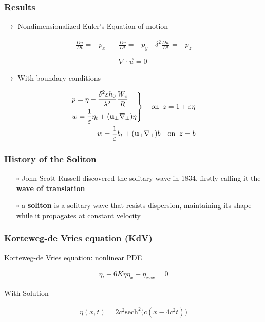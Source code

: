 \documentclass[fleqn]{beamer}
\begin{document}
    \begin{frame}
        \frametitle{Results}
        \centering
        $\rightarrow$ Nondimensionalized Euler's Equation of motion
        \begin{ceqn}
        \begin{align}
            \frac{Du}{Dt} = - p_x \quad
            &\frac{Dv}{Dt} = - p_y \quad
            \delta^2\frac{Dw}{Dt} = - p_z \nonumber\\
            \nonumber\\
            &\nabla \cdot \vec{u}  = 0\nonumber
        \end{align}
        \end{ceqn}
        \centering
        $\rightarrow$ With boundary conditions
        \begin{ceqn}
        \begin{align}
            \begin{drcases}
            p = \eta - \frac{\delta^2\varepsilon h_0}{\lambda^2} \frac{W_e}{R}\\
            w = \frac{1}{\varepsilon}\eta_t + (\mathbf{u}_\perp \nabla_\perp)\eta
            \end{drcases} \quad
            \text{on}\;\; z = 1+\varepsilon\eta\\
            w =\frac{1}{\varepsilon}b_t + (\mathbf{u}_\perp \nabla_\perp)b \quad
            \text{on}\;\; z=b
        \end{align}
        \end{ceqn}
    \end{frame}

    \begin{frame}
        \frametitle{History of the Soliton}
        \begin{itemize}
        \item[$\circ$] John Scott Russell discovered the solitary wave in 1834,
            firstly calling it the \textbf{wave of translation}
        \item[$\circ$] a \textbf{soliton} is a solitary wave that resists
            dispersion, maintaining its shape while it propagates at constant
            velocity\\
        \end{itemize}
    \end{frame}

    \begin{frame}
        \frametitle{Korteweg-de Vries equation (KdV)}
        Korteweg-de Vries equation: nonlinear PDE
        \begin{ceqn}
        \begin{align}
            \eta_t + 6K \eta \eta_{x} + \eta_{x x x} = 0\nonumber
        \end{align}
        \end{ceqn}
        With Solution
        \begin{ceqn}
        \begin{align}
            \eta(x, t) = 2c^2 \text{sech}^2\Big( c
            \left(x - 4c^2t\right)  \Big)\nonumber
        \end{align}
        \end{ceqn}
    \end{frame}
\end{document}
